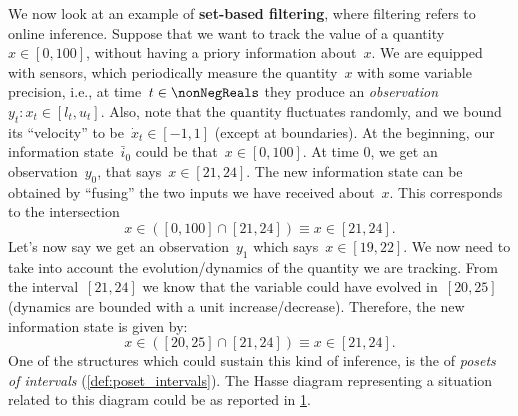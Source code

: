 \begin{example}
    We now look at an example of \textbf{set-based filtering}, where filtering refers to online inference.
    Suppose that we want to track the value of a quantity~$x\in [0,100]$, without having a priory information about~$x$.
    We are equipped with sensors, which periodically measure the quantity~$x$ with some variable precision, i.e., at time~$t\in \nonNegReals $ they produce an \emph{observation}~$y_t\colon x_t\in [l_t,u_t]$.
    Also, note that the quantity fluctuates randomly, and we bound its ``velocity'' to be~$\dot{x}_t\in [-1,1]$ (except at boundaries).
    At the beginning, our information state~$\bar{i}_0$ could be that~$x\in [0,100]$.
    At time 0, we get an observation~$y_0$, that says~$x\in [21,24]$.
    The new information state can be obtained by ``fusing'' the two inputs we have received about~$x$. This corresponds to the intersection
    \begin{equation*}
        x\in \left( [0,100] \cap [21,24]\right)\equiv x\in [21,24].
    \end{equation*}
    Let's now say we get an observation~$y_1$ which says~$x\in [19,22]$.
    We now need to take into account the evolution/dynamics of the quantity we are tracking. From the interval~$[21,24]$ we know that the variable could have evolved in~$[20,25]$ (dynamics are bounded with a unit increase/decrease). Therefore, the new information state is given by:
    \begin{equation*}
        x\in \left( [20,25] \cap [21,24]\right)\equiv x\in [21,24].
    \end{equation*}
    One of the structures which could sustain this kind of inference, is the of \emph{posets of intervals} (\cref{def:poset_intervals}).
    The Hasse diagram representing a situation related to this diagram could be as reported in \cref{fig:hasse_filtering}.
    \begin{figure}[h!]
        \begin{center}
        \end{center}
        \caption{\label{fig:hasse_filtering}}
    \end{figure}
\end{example}


